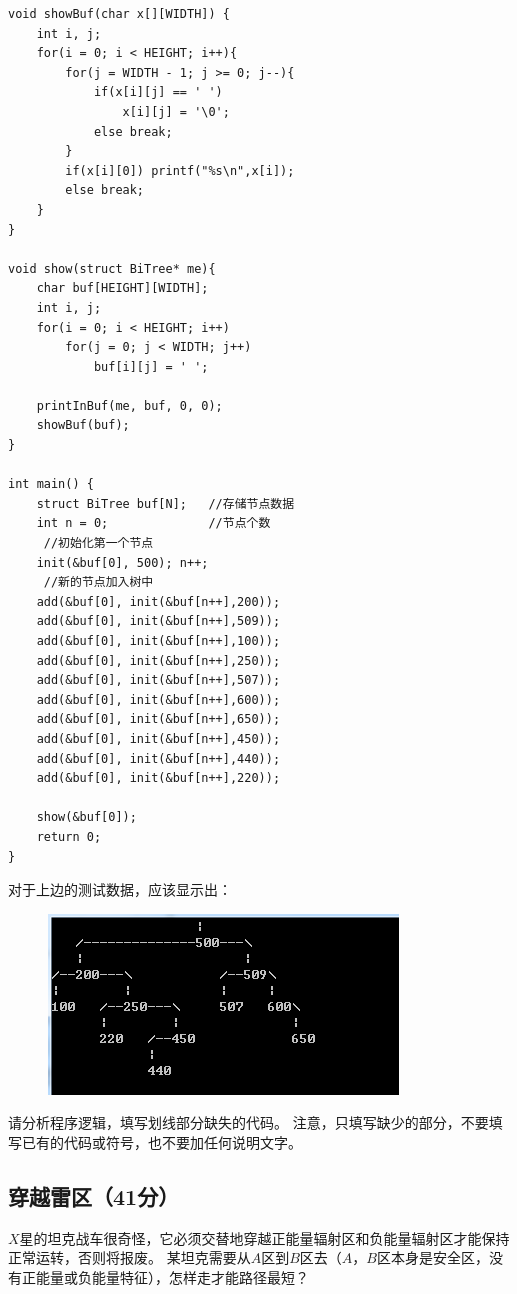 \documentclass[a4paper, 12pt, twocolumn]{ctexart}
\begin{document}
\begin{lstlisting}
void showBuf(char x[][WIDTH]) {
	int i, j;
	for(i = 0; i < HEIGHT; i++){
		for(j = WIDTH - 1; j >= 0; j--){
			if(x[i][j] == ' ')
				x[i][j] = '\0';
			else break;
		}
		if(x[i][0])	printf("%s\n",x[i]);
		else break;
	}
}
	
void show(struct BiTree* me){
	char buf[HEIGHT][WIDTH];
	int i, j;
	for(i = 0; i < HEIGHT; i++)
		for(j = 0; j < WIDTH; j++)
			buf[i][j] = ' ';
		
	printInBuf(me, buf, 0, 0);
	showBuf(buf);
}
	
int main() {	
	struct BiTree buf[N];	//存储节点数据 
	int n = 0;              //节点个数 
	 //初始化第一个节点 
	init(&buf[0], 500); n++; 
	 //新的节点加入树中 
	add(&buf[0], init(&buf[n++],200)); 
	add(&buf[0], init(&buf[n++],509));
	add(&buf[0], init(&buf[n++],100));
	add(&buf[0], init(&buf[n++],250));
	add(&buf[0], init(&buf[n++],507));
	add(&buf[0], init(&buf[n++],600));
	add(&buf[0], init(&buf[n++],650));
	add(&buf[0], init(&buf[n++],450));
	add(&buf[0], init(&buf[n++],440));
	add(&buf[0], init(&buf[n++],220));
	
	show(&buf[0]);	
	return 0;	
}
	\end{lstlisting}
	
	对于上边的测试数据，应该显示出：

	\begin{figure}[H]
		\centering
		\includegraphics[width=\linewidth]{004.png}
	\end{figure}
	
	请分析程序逻辑，填写划线部分缺失的代码。	
	注意，只填写缺少的部分，不要填写已有的代码或符号，也不要加任何说明文字。
	
	\subsection{穿越雷区（41分）}
	
	$X$星的坦克战车很奇怪，它必须交替地穿越正能量辐射区和负能量辐射区才能保持正常运转，否则将报废。
	某坦克需要从$A$区到$B$区去（$A$，$B$区本身是安全区，没有正能量或负能量特征），怎样走才能路径最短？
	
\end{document}
